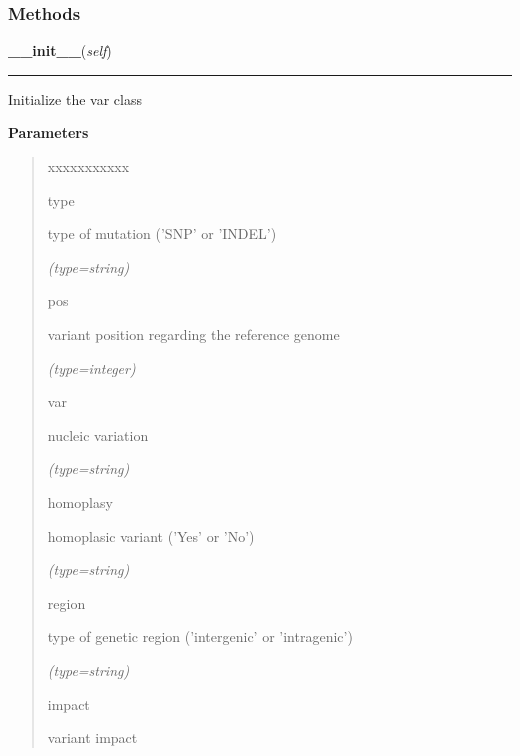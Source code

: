   \subsubsection{Methods}

    \vspace{0.5ex}

\hspace{.8\funcindent}\begin{boxedminipage}{\funcwidth}

    \raggedright \textbf{\_\_init\_\_}(\textit{self})

    \vspace{-1.5ex}

    \rule{\textwidth}{0.5\fboxrule}
\setlength{\parskip}{2ex}
    Initialize the var class

\setlength{\parskip}{1ex}
      \textbf{Parameters}
      \vspace{-1ex}

      \begin{quote}
        \begin{Ventry}{xxxxxxxxxxx}

          \item[type]

          type of mutation ('SNP' or 'INDEL')

            {\it (type=string)}

          \item[pos]

          variant position regarding the reference genome

            {\it (type=integer)}

          \item[var]

          nucleic variation

            {\it (type=string)}

          \item[homoplasy]

          homoplasic variant ('Yes' or 'No')

            {\it (type=string)}

          \item[region]

          type of genetic region ('intergenic' or 'intragenic')

            {\it (type=string)}

          \item[impact]

          variant impact


\end{Ventry}
\end{quote}
\end{boxedminipage}
